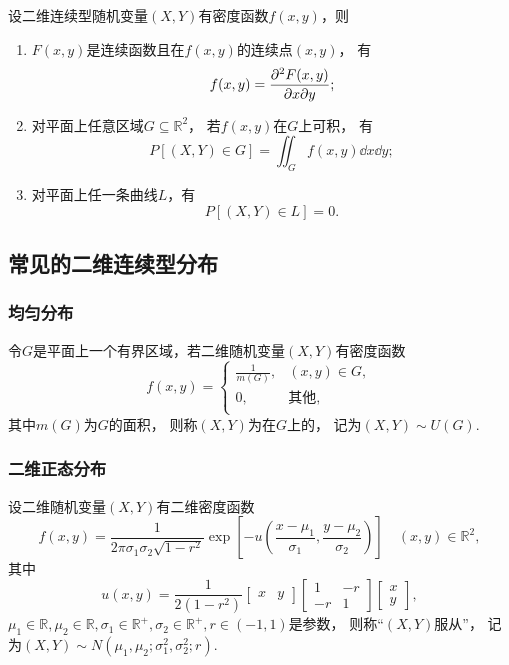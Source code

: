 \begin{theorem}
设二维连续型随机变量\((X,Y)\)有密度函数\(f(x,y)\)，则
\begin{enumerate}
	\item \(F(x,y)\)是连续函数且在\(f(x,y)\)的连续点\((x,y)\)，
	有\[
		f(x,y) = \pdv{F(x,y)}{x}{y};
	\]

	\item 对平面上任意区域\(G \subseteq \mathbb{R}^2\)，
	若\(f(x,y)\)在\(G\)上可积，
	有\[
		P\left[(X,Y) \in G\right] = \iint_G{f(x,y) \dd{x}\dd{y}};
	\]

	\item 对平面上任一条曲线\(L\)，有\[
		P\left[(X,Y) \in L\right] = 0.
	\]
\end{enumerate}
\end{theorem}

\subsection{常见的二维连续型分布}
\subsubsection{均匀分布}
\begin{definition}
令\(G\)是平面上一个有界区域，若二维随机变量\((X,Y)\)有密度函数\[
	f(x,y) = \left\{ \begin{array}{ll}
		\frac{1}{m(G)}, & (x,y) \in G, \\
		0, & \text{其他}, \\
	\end{array} \right.
\]
其中\(m(G)\)为\(G\)的面积，
则称\((X,Y)\)为在\(G\)上的，
记为\((X,Y) \sim U(G)\).
\end{definition}

\subsubsection{二维正态分布}
\begin{definition}
设二维随机变量\((X,Y)\)有二维密度函数
\begin{equation}
	f(x,y) = \frac{1}{2\pi\sigma_1\sigma_2\sqrt{1-r^2}}
		\exp\left[- u\left(
			\frac{x-\mu_1}{\sigma_1},
			\frac{y-\mu_2}{\sigma_2}
		\right)\right]
	\quad(x,y)\in\mathbb{R}^2,
\end{equation}
其中\[
	u(x,y)
	= \frac{1}{2(1-r^2)}
	\begin{bmatrix}
		x & y
	\end{bmatrix}
	\begin{bmatrix}
		1 & -r \\
		-r & 1
	\end{bmatrix}
	\begin{bmatrix}
		x \\ y
	\end{bmatrix},
\]
\(\mu_1\in\mathbb{R},
\mu_2\in\mathbb{R},
\sigma_1\in\mathbb{R}^+,
\sigma_2\in\mathbb{R}^+,
r\in(-1,1)\)是参数，
则称“\((X,Y)\)服从”，
记为\((X,Y) \sim N(\mu_1,\mu_2;\sigma_1^2,\sigma_2^2;r)\).
\end{definition}

